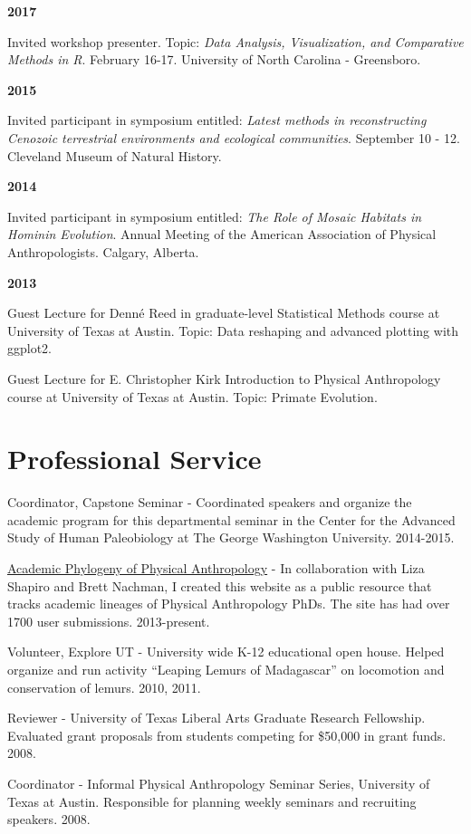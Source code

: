 \documentclass{article}
\begin{document}
\begin{description*}
\item[] {\bfseries 2017}
\item[] Invited workshop presenter. Topic: \emph{Data Analysis, Visualization, and Comparative Methods in R}. February 16-17. University of North Carolina - Greensboro. 

\begin{minipage}{\linewidth}
\item[] {\bfseries 2015}
\item[] Invited participant in symposium entitled: \emph{Latest methods in reconstructing Cenozoic terrestrial environments and ecological communities}. September 10 - 12. Cleveland Museum of Natural History. 
\end{minipage}
\item[] {\bfseries 2014}
\item[] Invited participant in symposium entitled: \emph{The Role of Mosaic Habitats in Hominin Evolution}. Annual Meeting of the American Association of Physical Anthropologists. Calgary, Alberta. 
\item[] {\bfseries 2013}
\item[]  Guest Lecture for Denn\'{e} Reed in graduate-level Statistical Methods course at University of Texas at Austin. Topic: Data reshaping and advanced plotting with ggplot2.
\item[] Guest Lecture for E. Christopher Kirk Introduction to Physical Anthropology course at University of Texas at Austin. Topic: Primate Evolution.
\end{description*}


\section*{Professional Service}
\begin{description*}
\item[] Coordinator, Capstone Seminar - Coordinated speakers and organize the academic program for this departmental seminar in the Center for the Advanced Study of Human Paleobiology at The George Washington University. 2014-2015.
\item[] \href{http://www.physanthphylogeny.org}{Academic Phylogeny of Physical Anthropology} - In collaboration with Liza Shapiro and Brett Nachman, I created this website as a public resource that tracks academic lineages of Physical Anthropology PhDs. The site has had over 1700 user submissions. 2013-present.
\item[] Volunteer, Explore UT - University wide K-12 educational open house. Helped organize and run activity ``Leaping Lemurs of Madagascar'' on locomotion and conservation of lemurs. 2010, 2011.
\item[] Reviewer - University of Texas Liberal Arts Graduate Research Fellowship. Evaluated grant proposals from students competing for \$50,000 in grant funds. 2008.
\item[] Coordinator - Informal Physical Anthropology Seminar Series, University of Texas at Austin. Responsible for planning weekly seminars and recruiting speakers. 2008.
\end{description*}
\end{document}
